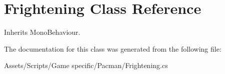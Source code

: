 \hypertarget{class_frightening}{\section{Frightening Class Reference}
\label{class_frightening}
}


Inherits Mono\-Behaviour.



The documentation for this class was generated from the following file\-:\begin{DoxyCompactItemize}
\item 
Assets/\-Scripts/\-Game specific/\-Pacman/Frightening.\-cs\end{DoxyCompactItemize}

